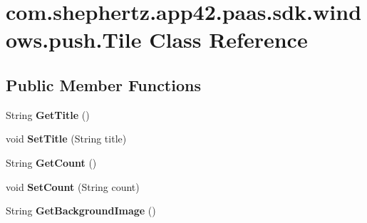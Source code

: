 \hypertarget{classcom_1_1shephertz_1_1app42_1_1paas_1_1sdk_1_1windows_1_1push_1_1_tile}{\section{com.\+shephertz.\+app42.\+paas.\+sdk.\+windows.\+push.\+Tile Class Reference}
\label{classcom_1_1shephertz_1_1app42_1_1paas_1_1sdk_1_1windows_1_1push_1_1_tile}
}
\subsection*{Public Member Functions}
\begin{DoxyCompactItemize}
\item 
\hypertarget{classcom_1_1shephertz_1_1app42_1_1paas_1_1sdk_1_1windows_1_1push_1_1_tile_a69b178da91445b6194176adaf1a054ea}{String {\bfseries Get\+Title} ()}\label{classcom_1_1shephertz_1_1app42_1_1paas_1_1sdk_1_1windows_1_1push_1_1_tile_a69b178da91445b6194176adaf1a054ea}

\item 
\hypertarget{classcom_1_1shephertz_1_1app42_1_1paas_1_1sdk_1_1windows_1_1push_1_1_tile_a0444770880f8f2bc8fafccbb2dd64177}{void {\bfseries Set\+Title} (String title)}\label{classcom_1_1shephertz_1_1app42_1_1paas_1_1sdk_1_1windows_1_1push_1_1_tile_a0444770880f8f2bc8fafccbb2dd64177}

\item 
\hypertarget{classcom_1_1shephertz_1_1app42_1_1paas_1_1sdk_1_1windows_1_1push_1_1_tile_a3d3e8d52b01419083b208e5ac710cfdf}{String {\bfseries Get\+Count} ()}\label{classcom_1_1shephertz_1_1app42_1_1paas_1_1sdk_1_1windows_1_1push_1_1_tile_a3d3e8d52b01419083b208e5ac710cfdf}

\item 
\hypertarget{classcom_1_1shephertz_1_1app42_1_1paas_1_1sdk_1_1windows_1_1push_1_1_tile_a6fe5cde861c7dcd591c92368f00ec3b8}{void {\bfseries Set\+Count} (String count)}\label{classcom_1_1shephertz_1_1app42_1_1paas_1_1sdk_1_1windows_1_1push_1_1_tile_a6fe5cde861c7dcd591c92368f00ec3b8}

\item 
\hypertarget{classcom_1_1shephertz_1_1app42_1_1paas_1_1sdk_1_1windows_1_1push_1_1_tile_ace903c4ac95c6babdfbf43a5ef77d53e}{String {\bfseries Get\+Background\+Image} ()}\label{classcom_1_1shephertz_1_1app42_1_1paas_1_1sdk_1_1windows_1_1push_1_1_tile_ace903c4ac95c6babdfbf43a5ef77d53e}


\end{DoxyCompactItemize}
